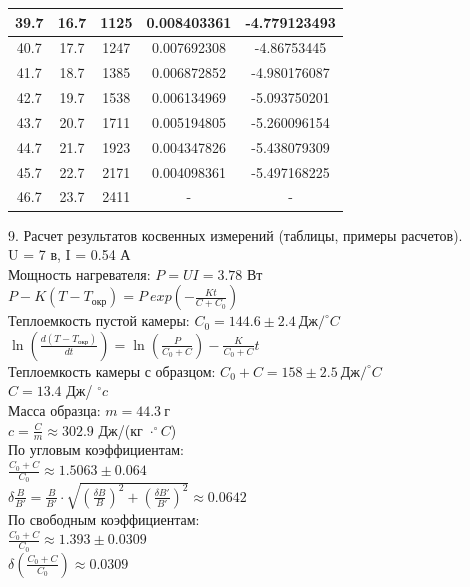 \documentclass[12pt]{article}
\begin{document}
\begin{flushleft}
\begin{table}[h!]
\begin{tabular}{|c|c|c|c|c|}
            39.7	&	16.7	&	1125	&	0.008403361	&	-4.779123493	\\
            \hline
            40.7	&	17.7	&	1247	&	0.007692308	&	-4.86753445	\\
            \hline
            41.7	&	18.7	&	1385	&	0.006872852	&	-4.980176087	\\
            \hline
            42.7	&	19.7	&	1538	&	0.006134969	&	-5.093750201	\\
            \hline
            43.7	&	20.7	&	1711	&	0.005194805	&	-5.260096154	\\
            \hline
            44.7	&	21.7	&	1923	&	0.004347826	&	-5.438079309	\\
            \hline
            45.7	&	22.7	&	2171	&	0.004098361	&	-5.497168225	\\
            \hline
            46.7	&	23.7	&	2411	&	-	&	-	\\
            \hline
        \end{tabular}
    \end{table}
\end{flushleft}

\begin{flushleft}
    9. Расчет результатов косвенных измерений (таблицы, примеры расчетов). \\
    U = 7 в, I = 0.54 А \\
    Мощность нагревателя: $ P = UI = 3.78 $ Вт \\
    $ P - K(T - T_\text{окр}) = P \ exp(-\frac{Kt}{C + C_0}) $ \\
    Теплоемкость пустой камеры: $ C_0 = 144.6 \pm 2.4 \ \text{Дж}/^\circ C $ \\
    $ \ln\left( \frac{d(T - T_{\text{окр}})}{dt} \right) = \ln\left( \frac{P}{C_0 + C} \right) - \frac{K}{C_0 + C} t $ \\
    Теплоемкость камеры с образцом: $ C_0 + C = 158 \pm 2.5 \ \text{Дж} / ^\circ C $ \\
    $ C = 13.4 $ Дж/ $^\circ c$ \\
    Масса образца: $ m = 44.3 \ \text{г} $ \\
    $ c = \frac{C}{m} \approx 302.9 $ Дж/(кг $ \cdot ^\circ C $) \\
    По угловым коэффициентам: \\
    $ \frac{C_0 + C}{C_0} \approx 1.5063 \pm 0.064 $ \\
    $ \delta \frac{B}{B'} = \frac{B}{B'} \cdot \sqrt{(\frac{\delta B}{B})^2 + (\frac{\delta B'}{B'})^2}  \approx 0.0642 $ \\
    По свободным коэффициентам: \\
    $ \frac{C_0 + C}{C_0} \approx 1.393 \pm 0.0309 $ \\
    $ \delta (\frac{C_0 + C}{C_0}) \approx 0.0309 $ \\

\end{flushleft}
\end{document}
